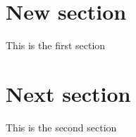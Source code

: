 \documentclass[a4paper,11pt,twoside]{book}
\begin{document}
    

    \tableofcontents

    \chapter{New section}

    This is the first section

    \chapter{Next section}

    This is the second section
\end{document}
